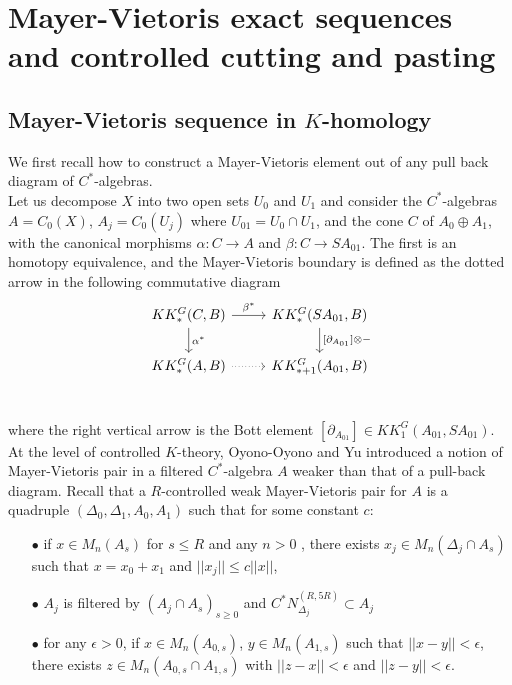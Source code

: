 \section{ Mayer-Vietoris exact sequences and controlled cutting and pasting}

\subsection{Mayer-Vietoris sequence in $K$-homology}

We first recall how to construct a Mayer-Vietoris element out of any pull back diagram of $C^*$-algebras.\\

Let us decompose $X$ into two open sets $U_0$ and $U_1$ and consider the $C^*$-algebras $A=C_0(X)$, $A_j=C_0(U_j)$ where $U_{01}=U_0\cap U_1$, and the cone $C$ of $A_0\oplus A_1$, with the canonical morphisms $\alpha :C \rightarrow A$ and $\beta : C \rightarrow SA_{01}$. The first is an homotopy equivalence, and the Mayer-Vietoris boundary is defined as the dotted arrow in the following commutative diagram
\[\begin{tikzcd}
KK^G_*(C,B) \arrow{r}{\beta^*}\arrow{d}{ \alpha^*}& KK^G_*(SA_{01},B)\arrow{d}{[\partial_{A_{01}}]\otimes -}\\
KK^G_*(A,B) \arrow[dotted]{r}& KK^G_{*+1}(A_{01},B)\\
\end{tikzcd}\]

where the right vertical arrow is the Bott element $[\partial_{A_{01}}]\in KK_1^G(A_{01},SA_{01})$.\\

At the level of controlled $K$-theory, Oyono-Oyono and Yu introduced a notion of Mayer-Vietoris pair in a filtered $C^*$-algebra $A$ weaker than that of a pull-back diagram. Recall that a $R$-controlled weak Mayer-Vietoris pair for $A$ is a quadruple $(\Delta_0,\Delta_1,A_0,A_1)$ such that for some constant $c$:\\

\begin{itemize}
\item[$\bullet$] if $x\in M_n(A_s)$ for $s\leq R$ and any $n>0$ , there exists $x_j\in M_n(\Delta_j\cap A_s)$ such that $x=x_0+x_1$ and $||x_j||\leq c||x||$,
\item[$\bullet$] $A_j$ is filtered by $(A_j\cap A_s)_{s\geq 0}$ and $C^* N_{\Delta_j}^{(R,5R)}\subset A_j$
\item[$\bullet$] for any $\epsilon >0$, if $x\in M_n(A_{0,s})$, $y\in M_n(A_{1,s})$ such that $||x-y||<\epsilon$,  there exists $z\in M_n(A_{0,s}\cap A_{1,s})$ with $||z-x||<\epsilon$ and $||z-y||<\epsilon$. \\
\end{itemize}

